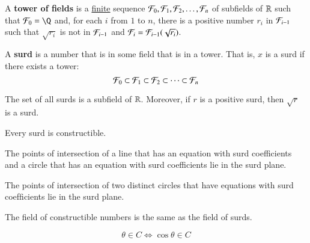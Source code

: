 \documentclass[11pt]{article}
\begin{document}
        \begin{definition}[12.2.16]
            A \textbf{tower of fields} is a \ul{finite} sequence $\mathcal{{F}}_0, \mathcal{{F}}_1, \mathcal{{F}}_2,\dots,\mathcal{{F}}_n$ of subfields of $\mathbb{R}$ such that $\mc{F}_0 = \Q$ and, for each $i$ from $1$ to $n$, there is a positive number $r_i$ in $\mathcal{{F}}_{i-1}$ such that $\sqrt{r_i}$ is not in $\mathcal{{F}}_{i-1}$ and $\mathcal{{F}}_i = \mathcal{{F}}_{i-1}(\sqrt{r_i})$.
        \end{definition}
        
        \begin{definition}[12.3.1]
            A \textbf{surd} is a number that is in some field that is in a tower. That is, $x$ is a surd if there exists a tower:
            \[
                \mathcal{{F}}_0 \subset \mathcal{{F}}_1 \subset \mathcal{{F}}_2 \subset \cdots \subset \mathcal{{F}}_n
            \]
        \end{definition}
        
        \begin{theorem}[12.3.2]
            The set of all surds is a subfield of $\mathbb{R}$. Moreover, if $r$ is a positive surd, then $\sqrt{r}$ is a surd.
        \end{theorem}
        
        \begin{theorem}[12.3.3]
            Every surd is constructible.
        \end{theorem}
        
        \begin{theorem}[12.3.10]
            The points of intersection of a line that has an equation with surd coefficients and a circle that has an equation with surd coefficients lie in the surd plane.
        \end{theorem}
        
        \begin{theorem}[12.3.11]
            The points of intersection of two distinct circles that have equations with surd coefﬁcients lie in the surd plane.
        \end{theorem}
        
        \begin{theorem}[12.3.12]
            The ﬁeld of constructible numbers is the same as the ﬁeld of surds.
        \end{theorem}
        
        \begin{theorem}[12.3.13]
            \[
                \theta \in C \iff \cos \theta \in C
            \]
        \end{theorem}
        
\end{document}
